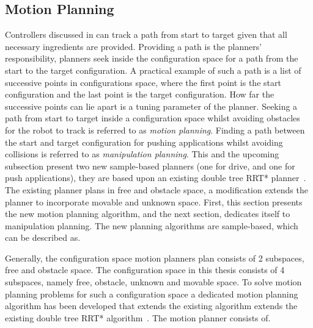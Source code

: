 \subsection{Motion Planning}%
\label{subsec:motion_planning}
Controllers discussed in  can track a path from start to target given that all necessary ingredients are provided. Providing a path is the planners' responsibility, planners seek inside the configuration space for a path from the start to the target configuration. A practical example of such a path is a list of successive points in configurations space, where the first point is the start configuration and the last point is the target configuration. How far the successive points can lie apart is a tuning parameter of the planner. Seeking a path from start to target inside a configuration space whilst avoiding obstacles for the robot to track is referred to as \textit{motion planning}. Finding a path between the start and target configuration for pushing applications whilst avoiding collisions is referred to as \textit{manipulation planning}. This and the upcoming subsection present two new sample-based planners (one for drive, and one for push applications), they are based upon an existing double tree \ac{RRT*} planner~\cite{chen_fast_2018}. The existing planner plans in free and obstacle space, a modification extends the planner to incorporate movable and unknown space. First, this section presents the new motion planning algorithm, and the next section,  dedicates itself to manipulation planning. The new planning algorithms are sample-based, which can be described as.\bs

\textit{}\bs

Generally, the configuration space motion planners plan consists of 2 subspaces, free and obstacle space. The configuration space in this thesis consists of 4 subspaces, namely free, obstacle, unknown and movable space. To solve motion planning problems for such a configuration space a dedicated motion planning algorithm has been developed that extends the existing algorithm extends the existing double tree \ac{RRT*} algorithm~\cite{chen_fast_2018}. The motion planner consists of.

